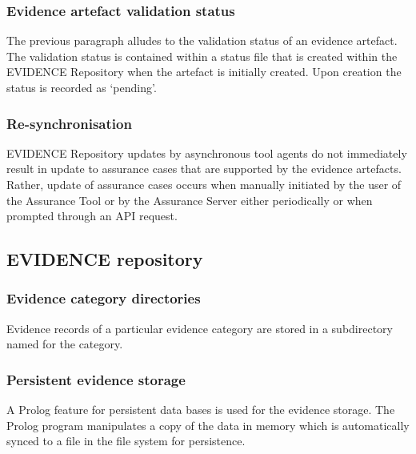 \documentclass[12pt,twoside,a4paper]{article}
\begin{document}
\hypertarget{evidence-artefact-validation-status}{%
\subsubsection{Evidence artefact validation status}\label{evidence-artefact-validation-status}}

The previous paragraph alludes to the validation status of an evidence artefact. The validation status is contained within a status file that is created within the EVIDENCE Repository when the artefact is initially created. Upon creation the status is recorded as `pending'.

\hypertarget{re-synchronisation}{%
\subsubsection{Re-synchronisation}\label{re-synchronisation}}

EVIDENCE Repository updates by asynchronous tool agents do not immediately result in update to assurance cases that are supported by the evidence artefacts. Rather, update of assurance cases occurs when manually initiated by the user of the Assurance Tool or by the Assurance Server either periodically or when prompted through an API request.

\hypertarget{evidence-repository-1}{%
\subsection{EVIDENCE repository}\label{evidence-repository-1}}

\hypertarget{evidence-category-directories}{%
\subsubsection{Evidence category directories}\label{evidence-category-directories}}

Evidence records of a particular evidence category are stored in a subdirectory named for the category.

\hypertarget{persistent-evidence-storage}{%
\subsubsection{Persistent evidence storage}\label{persistent-evidence-storage}}

A Prolog feature for persistent data bases is used for the evidence storage. The Prolog program manipulates a copy of the data in memory which is automatically synced to a file in the file system for persistence.
\end{document}
